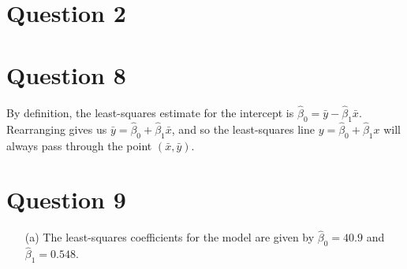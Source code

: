 \documentclass[10pt]{article}
\begin{document}
\section{Question 2} \noindent


\section{Question 8} \noindent
By definition, the least-squares estimate for the intercept is \(\hat{\beta}_0 = \bar{y} - \hat{\beta}_1 \bar{x}\).
Rearranging gives us \(\bar{y} = \hat{\beta}_0 + \hat{\beta}_1 \bar{x}\), and so the least-squares line \(y = \hat{\beta}_0 + \hat{\beta}_1 x\) will always 
pass through the point \((\bar{x}, \bar{y})\).

\section{Question 9} \noindent
\begin{itemize}
    \item[(a)] The least-squares coefficients for the model are given by \(\hat{\beta}_0 = 40.9\) and \(\hat{\beta}_1 = 0.548\).
\end{itemize}

\end{document}
